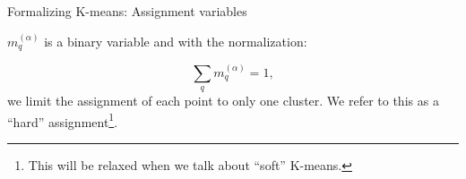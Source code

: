 \begin{frame}{Formalizing K-means: Assignment variables}


\pause

$m_q^{(\alpha)}$ is a binary variable and with the normalization:

\begin{equation}
    \label{eq:assignmentnormalization}
	\sum\limits_q m_q^{(\alpha)} = 1,
\end{equation}
we limit the assignment of each point to only one cluster. We refer to this as a ``hard'' assignment\footnote{This will be relaxed when we talk about ``soft'' K-means.}.

\end{frame}

